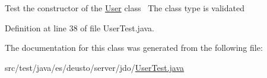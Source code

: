 Test the constructor of the \hyperlink{classes_1_1deusto_1_1server_1_1jdo_1_1_user}{User} class~\newline
The class type is validated~\newline


Definition at line 38 of file User\+Test.\+java.



The documentation for this class was generated from the following file\+:\begin{DoxyCompactItemize}
\item 
src/test/java/es/deusto/server/jdo/\hyperlink{_user_test_8java}{User\+Test.\+java}\end{DoxyCompactItemize}
